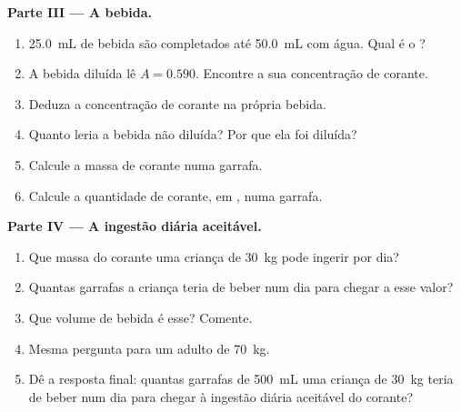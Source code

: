 \begin{problem}
\medskip
\noindent\textbf{Parte III --- A bebida.}
\begin{enumerate}[resume]
  \item \qty{25.0}{mL} de bebida são completados até \qty{50.0}{mL} com
        água. Qual é o ?
  \item A bebida diluída lê $A = 0.590$. Encontre a sua concentração de
        corante.
  \item Deduza a concentração de corante na própria bebida.
  \item Quanto leria a bebida não diluída? Por que ela foi diluída?
  \item Calcule a massa de corante numa garrafa.
  \item Calcule a quantidade de corante, em , numa garrafa.
\end{enumerate}

\medskip
\noindent\textbf{Parte IV --- A ingestão diária aceitável.}
\begin{enumerate}[resume]
  \item Que massa do corante uma criança de \qty{30}{kg} pode ingerir
        por dia?
  \item Quantas garrafas a criança teria de beber num dia para chegar a
        esse valor?
  \item Que volume de bebida é esse? Comente.
  \item Mesma pergunta para um adulto de \qty{70}{kg}.
  \item Dê a resposta final: quantas garrafas de \qty{500}{mL} uma
        criança de \qty{30}{kg} teria de beber num dia para chegar à
        ingestão diária aceitável do corante?
\end{enumerate}
\end{problem}
